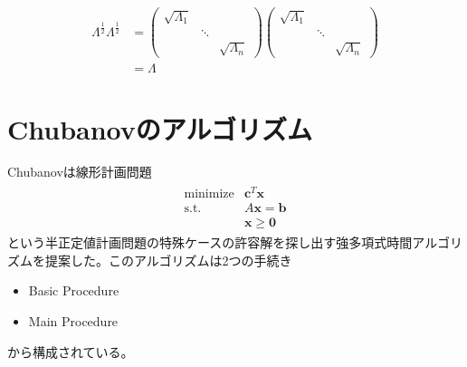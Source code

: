 \begin{align*}
  \Lambda^{\frac{1}{2}} \Lambda^{\frac{1}{2}} & = \left(
                                                    \begin{array}{ccc}
                                                      \sqrt{\Lambda_1} &        & \\
                                                                       & \ddots & \\
                                                                       &        & \sqrt{\Lambda_n}
                                                    \end{array}
                                                  \right)
                                                  \left(
                                                    \begin{array}{ccc}
                                                      \sqrt{\Lambda_1} &        & \\
                                                                       & \ddots & \\
                                                                       &        & \sqrt{\Lambda_n}
                                                    \end{array}
                                                  \right) \\
                                              & = \Lambda
\end{align*}

\section{Chubanovのアルゴリズム}
Chubanovは線形計画問題
\begin{align*}
  \begin{array}{ll}
    \text{minimize} & \mathbf{c}^T \mathbf{x} \\
    \text{s.t.}     & A \mathbf{x} = \mathbf{b} \\
                    & \mathbf{x} \geq \mathbf{0}
  \end{array}
\end{align*}
という半正定値計画問題の特殊ケースの許容解を探し出す強多項式時間アルゴリズムを提案した。このアルゴリズムは2つの手続き
\begin{itemize}
  \item Basic Procedure
  \item Main Procedure
\end{itemize}
から構成されている。


